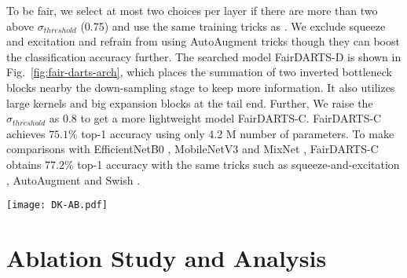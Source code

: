 \documentclass[runningheads]{llncs}
\begin{document}
To be fair, we select at most two choices per layer if there are more than two  above $\sigma_{threshold}$ (0.75) and use the same training tricks as \cite{tan2018mnasnet}. We exclude squeeze and excitation \cite{hu2018squeeze} and refrain from using AutoAugment \cite{cubuk2018autoaugment} tricks though they can boost the classification accuracy further. The searched model FairDARTS-D is shown in Fig.~\ref{fig:fair-darts-arch}, which places the summation of two inverted bottleneck blocks nearby the down-sampling stage to keep more information. It also utilizes large kernels and big expansion blocks at the tail end. Further, We raise the $\sigma_{threshold}$ as 0.8 to get a more lightweight model FairDARTS-C. FairDARTS-C achieves $75.1\%$ top-1 accuracy using only 4.2 M number of parameters. To make comparisons with EfficientNetB0 \cite{tan2019efficientnet}, MobileNetV3 \cite{howard2019searching} and MixNet \cite{tan2020mixconv}, FairDARTS-C obtains $77.2\%$ top-1 accuracy with the same tricks such as squeeze-and-excitation \cite{hu2018squeeze}, AutoAugment \cite{cubuk2018autoaugment} and Swish \cite{ramachandran2017searching}.

\begin{figure*}[ht]
	\centering
	\texttt{[image: DK-AB.pdf]}
	\caption{The Architecture of Fair DARTS-D (top) and C (bottom). IBE$x$\_K$y$ refers to an inverted bottleneck without an inset skip connection, while MBE$x$\_K$y$ is the one with it. BOTTLE\_K3 is the inverted bottleneck without expansion}
	\label{fig:fair-darts-arch}
\end{figure*}








\section{Ablation Study and Analysis}
\end{document}

